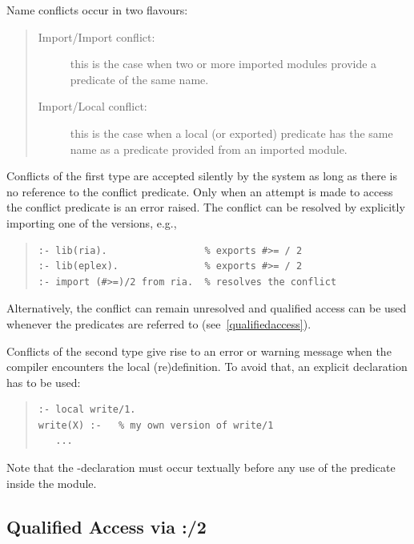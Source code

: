 Name conflicts occur in two flavours:
\begin{quote}
\begin{description}
\item[Import/Import conflict:]
    this is the case when two or more imported modules provide a
    predicate of the same name.
\item[Import/Local conflict:]
    this is the case when a local (or exported) predicate has the
    same name as a predicate provided from an imported module.
\end{description}
\end{quote}
Conflicts of the first type are accepted silently by the system as
long as there is no reference to the conflict predicate. Only when an attempt
is made to access the conflict predicate is an error raised.
The conflict can be resolved by explicitly importing one of the versions, e.g.,
\begin{quote}
\begin{verbatim}
:- lib(ria).                 % exports #>= / 2
:- lib(eplex).               % exports #>= / 2
:- import (#>=)/2 from ria.  % resolves the conflict
\end{verbatim}
\end{quote}
Alternatively, the conflict can remain unresolved and qualified access can
be used whenever the predicates are referred to (see~\ref{qualifiedaccess}).

Conflicts of the second type give rise to an error or warning message
when the compiler encounters the local (re)definition. To avoid that,
an explicit
declaration has to be used:
\begin{quote}
\begin{verbatim}
:- local write/1.
write(X) :-   % my own version of write/1
   ...
\end{verbatim}
\end{quote}
Note that the -declaration
must occur textually before any use of the predicate inside the module.


\subsection{Qualified Access via :/2\label{qualifiedaccess}}%


